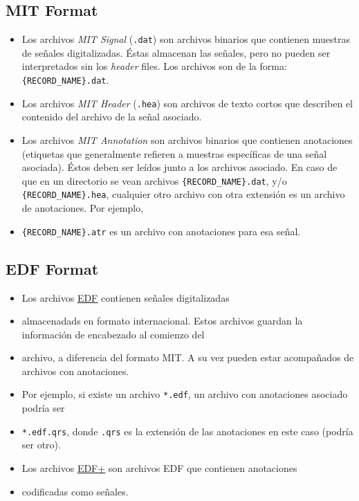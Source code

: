 \subsection*{MIT Format}
\begin{itemize}
  \item Los archivos \textit{MIT Signal} (\texttt{.dat}) son archivos binarios que contienen muestras de señales
  digitalizadas. Éstas almacenan las señales, pero no pueden ser interpretados sin los \textit{header} files.
  Los archivos son de la forma: \texttt{\{RECORD\_NAME\}.dat}.
  \item Los archivos \textit{MIT Header} (\texttt{.hea}) son archivos de texto cortos que describen el contenido
  del archivo de la señal asociado.
  \item Los archivos \textit{MIT Annotation} son archivos binarios que contienen anotaciones (etiquetas que
  generalmente refieren a muestras específicas de una señal asociada). Éstos deben ser leídos junto a los archivos
   asociado. En caso de que en un directorio se vean archivos \texttt{\{RECORD\_NAME\}.dat}, y/o
  \texttt{\{RECORD\_NAME\}.hea}, cualquier otro archivo con otra extensión es un archivo de anotaciones. Por ejemplo,
  \item \texttt{\{RECORD\_NAME\}.atr} es un archivo con anotaciones para esa señal.
\end{itemize}

\subsection*{EDF Format}
\begin{itemize}
  \item Los archivos \href{http://www.edfplus.info/specs/edf.html}{\underline{EDF}} contienen señales digitalizadas
  \item almacenadads en formato internacional. Estos archivos guardan la información de encabezado al comienzo del
  \item archivo, a diferencia del formato MIT. A su vez pueden estar acompañados de archivos con anotaciones.
  \item Por ejemplo, si existe un archivo \texttt{*.edf}, un archivo con anotaciones asociado podría ser
  \item \texttt{*.edf.qrs}, donde \texttt{.qrs} es la extensión de las anotaciones en este caso (podría ser otro).
  \item Los archivos
  \href{http://www.edfplus.info/specs/edfplus.html}{\underline{EDF+}} son archivos EDF que contienen anotaciones
  \item codificadas como señales.
\end{itemize}

